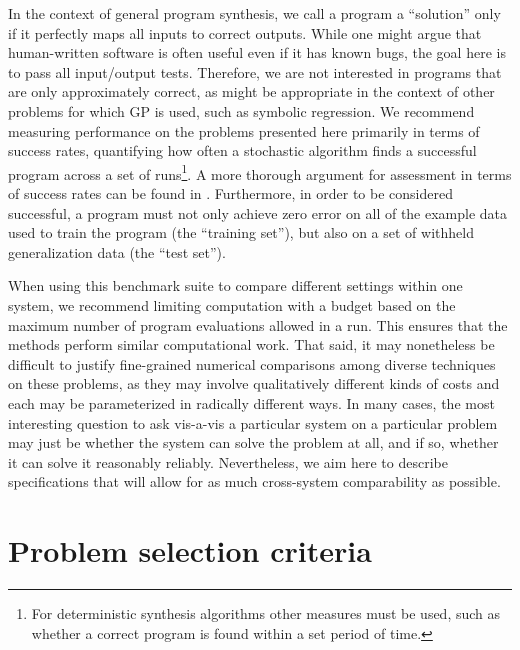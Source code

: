 \documentclass{sig-alternate}
\begin{document}
In the context of general program synthesis, we call a program a ``solution'' only if it perfectly maps all inputs to correct outputs. While one might argue that human-written software is often useful even if it has known bugs, the goal here is to pass all input/output tests. Therefore, we are not interested in programs that are only approximately correct, as might be appropriate in the context of other problems for which GP is used, such as symbolic regression. We recommend measuring performance on the problems presented here primarily in terms of success rates, quantifying how often a stochastic algorithm finds a successful program across a set of runs\footnote{For deterministic synthesis algorithms other measures must be used, such as whether a correct program is found within a set period of time.}. A more thorough argument for assessment in terms of success rates can be found in \cite{Helmuth:2014:GECCO}.
Furthermore, in order to be considered successful, a program must not only achieve zero error on all of the example data used to train the program (the ``training set''), but also on a set of withheld generalization data (the ``test set''). 



When using this benchmark suite to compare different settings within one system, we recommend limiting computation with a budget based on the maximum number of program evaluations allowed in a run. This ensures that the methods perform similar computational work. That said, it may nonetheless be difficult to justify fine-grained numerical comparisons among diverse techniques on these problems, as they may involve qualitatively different kinds of costs and each may be parameterized in radically different ways. In many cases, the most interesting question to ask vis-a-vis a particular system on a particular problem may just be whether the system can solve the problem at all, and if so,  whether it can solve it reasonably reliably. Nevertheless, we aim here to describe specifications that will allow for as much cross-system comparability as possible. %


\section{Problem selection criteria} \label{requirements}
\end{document}
